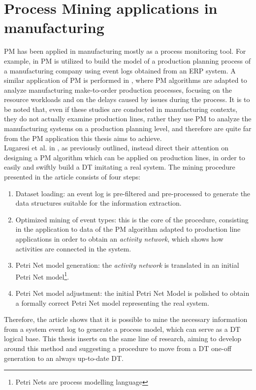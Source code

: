 \section{Process Mining applications in manufacturing}
PM has been applied in manufacturing mostly as a process monitoring tool. For example, in \cite{ErMahendrawathiandArsadNovalandAstutiH.M.andPradinaRennyandUtamiRivia} PM is utilized to build the model of a production planning process of a manufacturing company using event logs obtained from an ERP system. A similar application of PM is performed in \cite{ParkMinjeongandSongMinseokandBaekTaeandSonSookyoungandHaSeungandChoSung}, where PM algorithms are adapted to analyze manufacturing make-to-order production processes, focusing on the resource workloads and on the delays caused by issues during the process. It is to be noted that, even if these studies are conducted in manufacturing contexts, they do not actually examine production lines, rather they use PM to analyze the manufacturing systems on a production planning level, and therefore are quite far from the PM application this thesis aims to achieve. \\
Lugaresi et al. in \cite{LugaresiG.2019MsmG}, as previously outlined, instead direct their attention on designing a PM algorithm which can be applied on production lines, in order to easily and swiftly build a DT imitating a real system. The mining procedure presented in the article consists of four steps:
\begin{enumerate}
\item Dataset loading: an event log is pre-filtered and pre-processed to generate the data structures suitable for the information extraction.
\item Optimized mining of event types: this is the core of the procedure, consisting in the application to data of the PM algorithm adapted to production line applications in order to obtain an \textit{activity network}, which shows how activities are connected in the system.
\item Petri Net model generation: the \textit{activity network} is translated in an initial Petri Net model\footnote{Petri Nets are process modelling language}.
\item Petri Net model adjustment: the initial Petri Net Model is polished to obtain a formally correct Petri Net model representing the real system.
\end{enumerate}
Therefore, the article shows that it is possible to mine the necessary information from a system event log to generate a process model, which can serve as a DT logical base. This thesis inserts on the same line of research, aiming to develop around this method and suggesting a procedure to move from a DT one-off generation to an always up-to-date DT.
